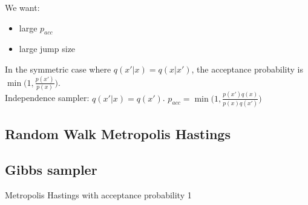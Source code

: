 \documentclass{article}
\begin{document}
\noindent
We want:  
\begin{itemize}
	\item large $p_{acc}$
	\item large jump size
\end{itemize}


\noindent
In the symmetric case where $q(x' | x) = q(x | x')$, the acceptance probability is $\min \Big(1, \frac{p(x')}{p(x)} \Big)$. \\

\noindent
Independence sampler:  $q(x' | x) = q(x')$. $p_{acc} = \min \Big(1, \frac{p(x')q(x)}{p(x) q(x')} \Big)$ \\

\subsection{Random Walk Metropolis Hastings}

\subsection{Gibbs sampler}
Metropolis Hastings with acceptance probability 1
\end{document}
